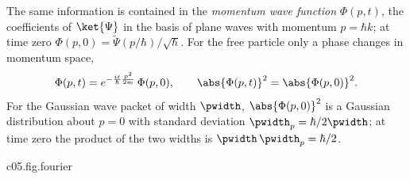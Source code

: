 The same information is contained in the \emph{momentum wave function} $\Phi(p,t)$, the
coefficients of $\ket{\Psi}$ in the basis of plane waves with momentum $p = \hbar k$; at time
zero $\Phi(p,0) = \widetilde{\Psi}(p/\hbar)/\sqrt{\hbar}$. For the free particle only a phase
changes in momentum space,
\begin{equation}\label{c05.eq.impulszeit}
  \Phi(p,t) = e^{-\frac{it}{\hbar}\frac{p^2}{2m}}\,\Phi(p,0),
  \qquad
  \abs{\Phi(p,t)}^2 = \abs{\Phi(p,0)}^2 .
\end{equation}
For the Gaussian wave packet of width $\pwidth$, $\abs{\Phi(p,0)}^2$ is a Gaussian
distribution about $p = 0$ with standard deviation $\pwidth_p = \hbar/2\pwidth$; at time zero
the product of the two widths is $\pwidth\,\pwidth_p = \hbar/2$.

\begin{tpcfigure}{c05.fig.fourier}
  \caption{The Gaussian wave packet at time $t = 0$, three times, with widths $\pwidth/2$,
    $\pwidth$ and $2\pwidth$, on the left in position space, on the right in momentum space;
    the same line means the same packet. The bars above the curves mark $\pm$ one standard
    deviation: halving the width in position space doubles it in momentum space. The order of
    the widths is reversed, the product stays. In time the curves on the left spread according
    to Equation~\eqref{c05.eq.zerfliessen}, those on the right stay put according to
    Equation~\eqref{c05.eq.impulszeit}.}
\end{tpcfigure}
